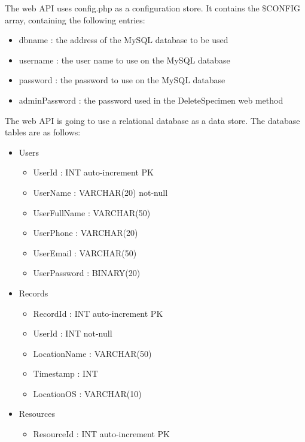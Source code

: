 \begin{itemize}
\begin{itemize}
\begin{itemize}
\begin{itemize}
		The web API uses config.php as a configuration store. It contains the \$CONFIG array, containing the following entries:
		
		 \begin{itemize}
			 	\item dbname : the address of the MySQL database to be used
			 	\item username : the user name to use on the MySQL database
			 	\item password : the password to use on the MySQL database
			 	\item adminPassword : the password used in the DeleteSpecimen web method
		\end{itemize}
        The web API is going to use a relational database as a data store.
        The database tables are as follows:

        \begin{itemize}
            \item Users
            \begin{itemize}
                \item UserId : INT auto-increment PK
                \item UserName : VARCHAR(20) not-null
                \item UserFullName : VARCHAR(50)
                \item UserPhone : VARCHAR(20)
                \item UserEmail : VARCHAR(50)
                \item UserPassword : BINARY(20)
            \end{itemize}
                
            \item Records
            \begin{itemize}
                \item RecordId : INT auto-increment PK
                \item UserId : INT not-null
                \item LocationName : VARCHAR(50)
                \item Timestamp : INT
                \item LocationOS : VARCHAR(10)
            \end{itemize}
                
            \item Resources
            \begin{itemize}
                \item ResourceId : INT auto-increment PK
            \end{itemize}
            

\end{itemize}
\end{itemize}
\end{itemize}
\end{itemize}
\end{itemize}
